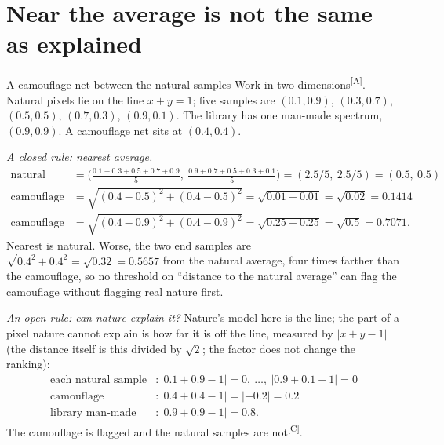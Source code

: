 \documentclass[11pt,a4paper,oneside,openany]{book}
\newcommand{\comp}{\textsuperscript{\textsf{\scriptsize[C]}}}
\newcommand{\assm}{\textsuperscript{\textsf{\scriptsize[A]}}}
\begin{document}
\section{Near the average is not the same as explained}

\begin{worked}[label=we:openset]{A camouflage net between the natural samples}
Work in two dimensions\assm. Natural pixels lie on the line $x+y=1$; five samples are $(0.1,0.9)$, $(0.3,0.7)$, $(0.5,0.5)$, $(0.7,0.3)$, $(0.9,0.1)$. The library has
one man-made spectrum, $(0.9,0.9)$. A camouflage net sits at $(0.4,0.4)$.

\emph{A closed rule: nearest average.}
\begin{align*}
\text{natural average} &= \big(\tfrac{0.1+0.3+0.5+0.7+0.9}5,\ \tfrac{0.9+0.7+0.5+0.3+0.1}5\big)=(2.5/5,\ 2.5/5)=(0.5,\ 0.5)\\
\text{camouflage to it} &= \sqrt{(0.4-0.5)^2+(0.4-0.5)^2}=\sqrt{0.01+0.01}=\sqrt{0.02}=0.1414\\
\text{camouflage to the library} &= \sqrt{(0.4-0.9)^2+(0.4-0.9)^2}=\sqrt{0.25+0.25}=\sqrt{0.5}=0.7071 .
\end{align*}
Nearest is natural. Worse, the two end samples are $\sqrt{0.4^2+0.4^2}=\sqrt{0.32}=0.5657$ from the natural average, four times farther than the camouflage, so no
threshold on ``distance to the natural average'' can flag the camouflage without flagging real nature first.

\emph{An open rule: can nature explain it?} Nature's model here is the line; the part of a pixel nature cannot explain is how far it is off the line, measured by
$|x+y-1|$ (the distance itself is this divided by $\sqrt2$; the factor does not change the ranking):
\begin{align*}
\text{each natural sample} &: |0.1+0.9-1|=0,\ \dots,\ |0.9+0.1-1|=0\\
\text{camouflage} &: |0.4+0.4-1|=|-0.2|=0.2\\
\text{library man-made} &: |0.9+0.9-1|=0.8 .
\end{align*}
The camouflage is flagged and the natural samples are not\comp.
\end{worked}
\end{document}
